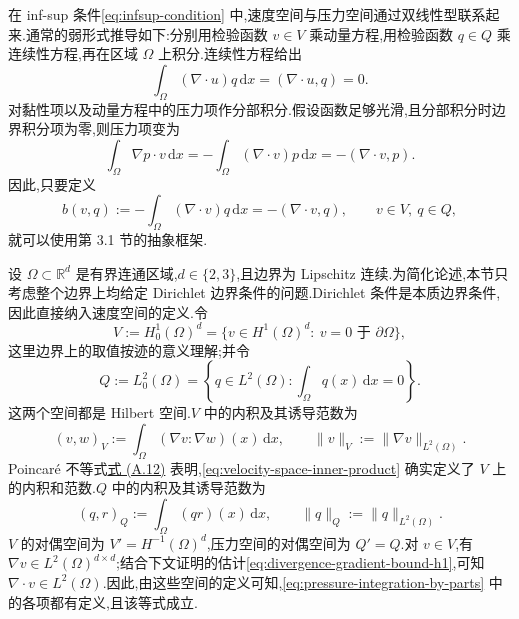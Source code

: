 \begin{note}\label{note:bilinear-form-b-flow}
在 inf-sup 条件\cref{eq:infsup-condition} 中,速度空间与压力空间通过双线性型联系起来.通常的弱形式推导如下:分别用检验函数 $v\in V$ 乘动量方程,用检验函数 $q\in Q$ 乘连续性方程,再在区域 $\Omega$ 上积分.连续性方程给出
\[
  \int_\Omega (\nabla\cdot u)q\,\mathrm{d}x
    =(\nabla\cdot u,q)=0.
\]
对黏性项以及动量方程中的压力项作分部积分.假设函数足够光滑,且分部积分时边界积分项为零,则压力项变为
\begin{equation}\label{eq:pressure-integration-by-parts}
  \int_\Omega \nabla p\cdot v\,\mathrm{d}x
    =-\int_\Omega (\nabla\cdot v)p\,\mathrm{d}x
    =-(\nabla\cdot v,p).
\end{equation}
因此,只要定义
\begin{equation}\label{eq:incompressible-bilinear-form}
  b(v,q):=-\int_\Omega (\nabla\cdot v)q\,\mathrm{d}x
       =-(\nabla\cdot v,q),
       \qquad v\in V,\ q\in Q,
\end{equation}
就可以使用第 3.1 节的抽象框架.
\end{note}

\begin{note}\label{note:velocity-pressure-spaces-dirichlet}
设 $\Omega\subset\mathbb{R}^d$ 是有界连通区域,$d\in\{2,3\}$,且边界为 Lipschitz 连续.为简化论述,本节只考虑整个边界上均给定 Dirichlet 边界条件的问题.Dirichlet 条件是本质边界条件,因此直接纳入速度空间的定义.令
\[
  V:=H_0^1(\Omega)^d
   =\{v\in H^1(\Omega)^d:\ v=0\text{ 于 }\partial\Omega\},
\]
这里边界上的取值按迹的意义理解;并令
\[
  Q:=L_0^2(\Omega)
   =\left\{q\in L^2(\Omega):\int_\Omega q(x)\,\mathrm{d}x=0\right\}.
\]
这两个空间都是 Hilbert 空间.$V$ 中的内积及其诱导范数为
\begin{equation}\label{eq:velocity-space-inner-product}
  (v,w)_V:=\int_\Omega (\nabla v:\nabla w)(x)\,\mathrm{d}x,
  \qquad \|v\|_V:=\|\nabla v\|_{L^2(\Omega)}.
\end{equation}
Poincaré 不等式\hyperref[eq:appendix-a-12]{式 (A.12)} 表明,\cref{eq:velocity-space-inner-product} 确实定义了 $V$ 上的内积和范数.$Q$ 中的内积及其诱导范数为
\[
  (q,r)_Q:=\int_\Omega (qr)(x)\,\mathrm{d}x,
  \qquad \|q\|_Q:=\|q\|_{L^2(\Omega)}.
\]
$V$ 的对偶空间为 $V'=H^{-1}(\Omega)^d$,压力空间的对偶空间为 $Q'=Q$.对 $v\in V$,有 $\nabla v\in L^2(\Omega)^{d\times d}$;结合下文证明的估计\cref{eq:divergence-gradient-bound-h1},可知 $\nabla\cdot v\in L^2(\Omega)$.因此,由这些空间的定义可知,\cref{eq:pressure-integration-by-parts} 中的各项都有定义,且该等式成立.
\end{note}


